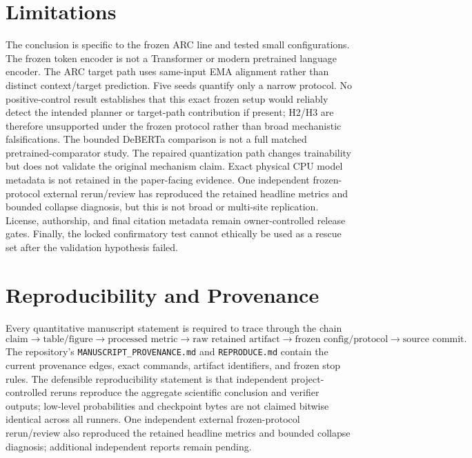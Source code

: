 \documentclass[11pt]{article}
\begin{document}
\section{Limitations}
The conclusion is specific to the frozen ARC line and tested small configurations. The frozen token encoder is not a Transformer or modern pretrained language encoder. The ARC target path uses same-input EMA alignment rather than distinct context/target prediction. Five seeds quantify only a narrow protocol. No positive-control result establishes that this exact frozen setup would reliably detect the intended planner or target-path contribution if present; H2/H3 are therefore unsupported under the frozen protocol rather than broad mechanistic falsifications. The bounded DeBERTa comparison is not a full matched pretrained-comparator study. The repaired quantization path changes trainability but does not validate the original mechanism claim. Exact physical CPU model metadata is not retained in the paper-facing evidence. One independent frozen-protocol external rerun/review has reproduced the retained headline metrics and bounded collapse diagnosis, but this is not broad or multi-site replication. License, authorship, and final citation metadata remain owner-controlled release gates. Finally, the locked confirmatory test cannot ethically be used as a rescue set after the validation hypothesis failed.

\section{Reproducibility and Provenance}
Every quantitative manuscript statement is required to trace through the chain
\[
\text{claim} \rightarrow \text{table/figure} \rightarrow \text{processed metric} \rightarrow \text{raw retained artifact} \rightarrow \text{frozen config/protocol} \rightarrow \text{source commit}.
\]
The repository's \texttt{MANUSCRIPT\_PROVENANCE.md} and \texttt{REPRODUCE.md} contain the current provenance edges, exact commands, artifact identifiers, and frozen stop rules. The defensible reproducibility statement is that independent project-controlled reruns reproduce the aggregate scientific conclusion and verifier outputs; low-level probabilities and checkpoint bytes are not claimed bitwise identical across all runners. One independent external frozen-protocol rerun/review also reproduced the retained headline metrics and bounded collapse diagnosis; additional independent reports remain pending.
\end{document}

